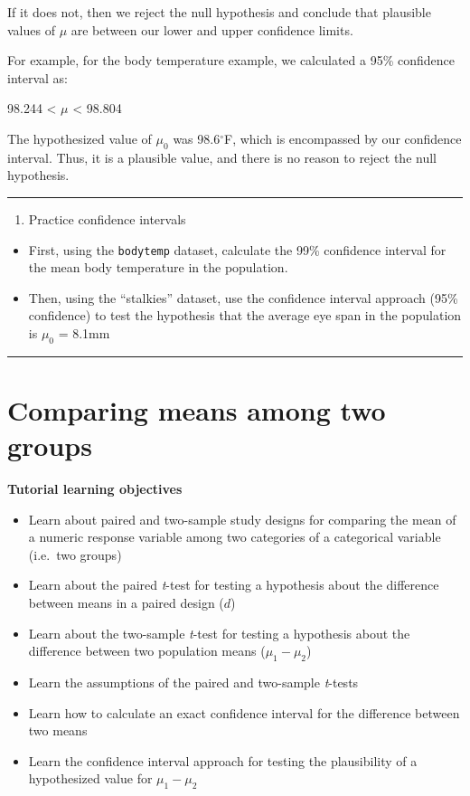 \documentclass[
]{book}
\providecommand{\tightlist}{%
  \setlength{\itemsep}{0pt}\setlength{\parskip}{0pt}}
\begin{document}
If it does not, then we reject the null hypothesis and conclude that plausible values of \(\mu\) are between our lower and upper confidence limits.

For example, for the body temperature example, we calculated a 95\% confidence interval as:

98.244 \textless{} \(\mu\) \textless{} 98.804

The hypothesized value of \(\mu_0\) was 98.6\(^\circ\)F, which is encompassed by our confidence interval. Thus, it is a plausible value, and there is no reason to reject the null hypothesis.

\begin{center}\rule{0.5\linewidth}{0.5pt}\end{center}

\begin{enumerate}
\def\labelenumi{\arabic{enumi}.}
\tightlist
\item
  Practice confidence intervals
\end{enumerate}

\begin{itemize}
\tightlist
\item
  First, using the \texttt{bodytemp} dataset, calculate the 99\% confidence interval for the mean body temperature in the population.\\
\item
  Then, using the ``stalkies'' dataset, use the confidence interval approach (95\% confidence) to test the hypothesis that the average eye span in the population is \(\mu_0\) = 8.1mm
\end{itemize}

\begin{center}\rule{0.5\linewidth}{0.5pt}\end{center}

\chapter{Comparing means among two groups}\label{compare_two_means}

\textbf{Tutorial learning objectives}

\begin{itemize}
\tightlist
\item
  Learn about paired and two-sample study designs for comparing the mean of a numeric response variable among two categories of a categorical variable (i.e.~two groups)
\item
  Learn about the paired \emph{t}-test for testing a hypothesis about the difference between means in a paired design (\(d\))
\item
  Learn about the two-sample \emph{t}-test for testing a hypothesis about the difference between two population means (\(\mu_1 - \mu_2\))
\item
  Learn the assumptions of the paired and two-sample \emph{t}-tests
\item
  Learn how to calculate an exact confidence interval for the difference between two means
\item
  Learn the confidence interval approach for testing the plausibility of a hypothesized value for \(\mu_1 - \mu_2\)
\end{itemize}
\end{document}
